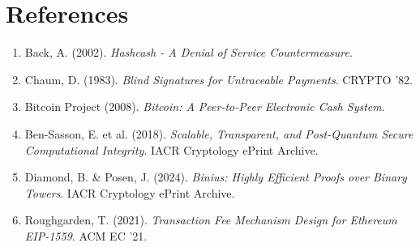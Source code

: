 \documentclass[10pt,conference,letterpaper]{IEEEtran}
\begin{document}
\section*{References}
\begin{enumerate}
    \item Back, A. (2002). \textit{Hashcash - A Denial of Service Countermeasure}.
    \item Chaum, D. (1983). \textit{Blind Signatures for Untraceable Payments}. CRYPTO '82.
    \item Bitcoin Project (2008). \textit{Bitcoin: A Peer-to-Peer Electronic Cash System}.
    \item Ben-Sasson, E. et al. (2018). \textit{Scalable, Transparent, and Post-Quantum Secure Computational Integrity}. IACR Cryptology ePrint Archive.
    \item Diamond, B. \& Posen, J. (2024). \textit{Binius: Highly Efficient Proofs over Binary Towers}. IACR Cryptology ePrint Archive.
    \item Roughgarden, T. (2021). \textit{Transaction Fee Mechanism Design for Ethereum EIP-1559}. ACM EC '21.
\end{enumerate}
\end{document}
